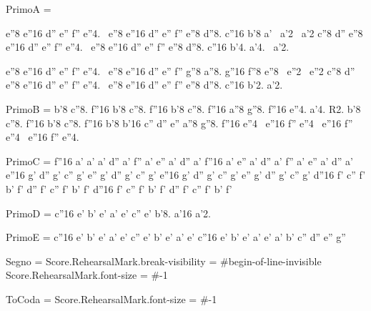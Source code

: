 


PrimoA = {
  e''8 e''16 d'' e'' f'' e''4.~
  e''8 e''16 d'' e'' f'' e''8 d''8. c''16
  b'8 a'~ a'2~
  a'2 c''8 d''
  e''8 e''16 d'' e'' f'' e''4.~
  e''8 e''16 d'' e'' f'' e''8 d''8. c''16
  b'4. a'4.~
  a'2.

  e''8 e''16 d'' e'' f'' e''4.~
  e''8 e''16 d'' e'' f'' g''8 a''8. g''16
  f''8 e''8~ e''2~
  e''2 c''8 d''
  e''8 e''16 d'' e'' f'' e''4.~
  e''8 e''16 d'' e'' f'' e''8 d''8. c''16
  b'2.
  a'2.
}

PrimoB = {
  b'8 c''8. f''16 b'8 c''8. f''16
  b'8 c''8. f''16 a''8 g''8. f''16
  e''4. a'4.
  R2.
  b'8 c''8. f''16 b'8 c''8. f''16
  b'8 b'16 c'' d'' e'' a''8 g''8. f''16
  e''4~ e''16 f'' e''4~ e''16 f''
  e''4~ e''16 f'' e''4.
}

PrimoC = {
  f''16 a' a' a' d'' a' f'' a' e'' a' d'' a'
  f''16 a' e'' a' d'' a' f'' a' e'' a' d'' a'
  e''16 g' d'' g' c'' g' e'' g' d'' g' c'' g'
  e''16 g' d'' g' c'' g' e'' g' d'' g' c'' g'
  d''16 f' c'' f' b' f' d'' f' c'' f' b' f'
  d''16 f' c'' f' b' f' d'' f' c'' f' b' f'
}

PrimoD = {
  c''16 e' b' e' a' e' c'' e' b'8. a'16
  a'2.
}

PrimoE = {
  c''16 e' b' e' a' e' c'' e' b' e' a' e'
  c''16 e' b' e' a' e' a' b' c'' d'' e'' g''
}

Segno = {
    \once \override Score.RehearsalMark.break-visibility = #begin-of-line-invisible
    \once \override Score.RehearsalMark.font-size = #-1
    \mark {}
}

ToCoda = {
    \once \override Score.RehearsalMark.font-size = #-1
    \mark {}
}

